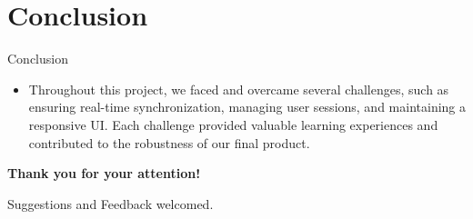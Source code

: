 \documentclass{beamer}
\begin{document}
\section{Conclusion}

\begin{frame}{Conclusion}
    \begin{itemize}
        \item Throughout this project, we faced and overcame several challenges, such as ensuring real-time synchronization, managing user sessions, and maintaining a responsive UI. Each challenge provided valuable learning experiences and contributed to the robustness of our final product.
    \end{itemize}
    \vfill
    \begin{center}
        \textbf{Thank you for your attention!}
    \end{center}
    \begin{center}
        Suggestions and Feedback welcomed.
    \end{center}
\end{frame}
\end{document}
